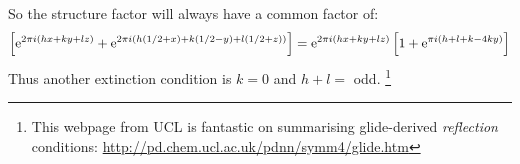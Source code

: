 \begin{parts}
	So the structure factor will always have a common factor of:
	\begin{equation*}
		\left[
		 \mathrm{e}^{2\pi i\left(hx+ky+lz\right)} + \mathrm{e}^{2\pi i\left(h(1/2 + x) + k(1/2 - y) +l(1/2 + z)\right)}
		\right]
		= \mathrm{e}^{2\pi i\left(hx+ky+lz\right)}
		\left[
		 1 + \mathrm{e}^{\pi i\left(h+l+k-4ky\right)}
		\right]
	\end{equation*}
	Thus another extinction condition is $k=0$ and $h+l=$ odd.%
	\footnote{This webpage from UCL is fantastic on summarising glide-derived \textit{reflection} conditions: \url{http://pd.chem.ucl.ac.uk/pdnn/symm4/glide.htm}}
\end{parts}